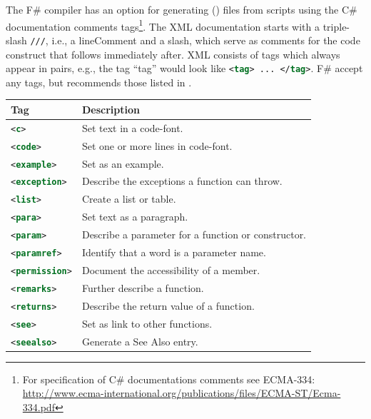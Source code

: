 \documentclass[fsharpnotes.tex]{subfiles}
\begin{document}
The F\# compiler has an option for generating  () files from scripts using the C\# documentation comments tags\footnote{For specification of C\# documentations comments see ECMA-334: \url{http://www.ecma-international.org/publications/files/ECMA-ST/Ecma-334.pdf}}. The XML documentation starts with a triple-slash \lstinline{///}, i.e., a lineComment and a slash, which serve as comments for the code construct that follows immediately after. XML consists of tags which always appear in pairs, e.g., the tag ``tag'' would look like \lstinline[language=xml]!<tag> ... </tag>!. F\# accept any tags, but recommends those listed in .
\begin{table}
  \centering
  \begin{tabularx}{\linewidth}{|l|X|}
       \hline
    \rowcolor{headerRowColor} Tag & Description\\
    \hline
    \lstinline[language=xml]!<c>! &Set text in a code-font.\\
    \hline
    \lstinline[language=xml]!<code>! &Set one or more lines in code-font.\\
    \hline
    \lstinline[language=xml]!<example>! &Set as an example.\\
    \hline
    \lstinline[language=xml]!<exception>! &Describe the exceptions a function can throw.\\
    \hline
    \lstinline[language=xml]!<list>! &Create a list or table.\\
    \hline
    \lstinline[language=xml]!<para>! &Set text as a paragraph.\\
    \hline
    \lstinline[language=xml]!<param>! &Describe a parameter for a function or constructor.\\
    \hline
    \lstinline[language=xml]!<paramref>! &Identify that a word is a parameter name.\\
    \hline
    \lstinline[language=xml]!<permission>! &Document the accessibility of a member.\\
    \hline
    \lstinline[language=xml]!<remarks>! &Further describe a function.\\
    \hline
    \lstinline[language=xml]!<returns>! &Describe the return value of a function.\\
    \hline
    \lstinline[language=xml]!<see>! &Set as link to other functions.\\
    \hline
    \lstinline[language=xml]!<seealso>! &Generate a See Also entry.\\

\end{tabularx}
\end{table}
\end{document}
